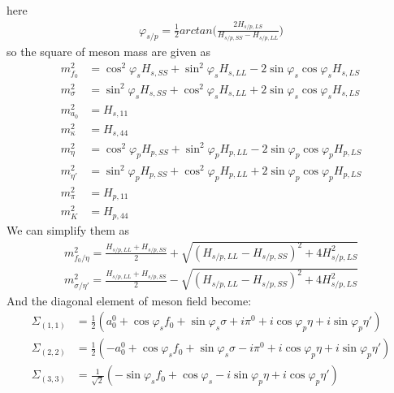 \documentclass[%
reprint,
superscriptaddress,
showpacs,preprintnumbers,
amsmath,amssymb,
aps,
prd,
]{revtex4-1}
\begin{document}
here
\begin{align}
\varphi_{s/p}=\frac{1}{2} arctan\Bigg(\frac{2H_{s/p,LS}}{H_{s/p,SS}-H_{s/p,LL}}\Bigg)
\end{align}
so the square of meson mass are given as
\begin{align}
m_{f_0}^2&=\cos^2\varphi_s H_{s,SS}+\sin^2 \varphi_s H_{s,LL}-2 \sin \varphi_s \cos \varphi_s H_{s,LS}\\
m_{\sigma}^2&=\sin^2\varphi_s H_{s,SS}+\cos^2 \varphi_s H_{s,LL}+2 \sin \varphi_s \cos \varphi_s H_{s,LS}\\
m_{a_0}^2&=H_{s,11}\\
m_{\kappa}^2&=H_{s,44}\\
m_{\eta}^2&=\cos^2\varphi_p H_{p,SS}+\sin^2 \varphi_p H_{p,LL}-2 \sin \varphi_p \cos \varphi_p H_{p,LS}\\
m_{\eta'}^2&=\sin^2\varphi_p H_{p,SS}+\cos^2 \varphi_p H_{p,LL}+2 \sin \varphi_p \cos \varphi_p H_{p,LS}\\
m_{\pi}^2&=H_{p,11}\\
m_{K}^2&=H_{p,44}
\end{align}
We can simplify them as
 \begin{align}
m_{f_0/\eta}^2=\frac{H_{s/p,LL}+H_{s/p,SS}}{2}+\sqrt{(H_{s/p,LL}-H_{s/p,SS})^2+4 H_{s/p,LS}^2}\\
m_{\sigma/\eta'}^2=\frac{H_{s/p,LL}+H_{s/p,SS}}{2}-\sqrt{(H_{s/p,LL}-H_{s/p,SS})^2+4 H_{s/p,LS}^2}
\end{align}
And the diagonal element of meson field become:
\begin{align}
\Sigma_{(1,1)}&=\frac{1}{2}(a_0^0+\cos\varphi_s f_0+\sin\varphi_s \sigma+i\pi^0 + i \cos\varphi_p \eta+i\sin\varphi_p \eta')\\
\Sigma_{(2,2)}&=\frac{1}{2}(- a_0^0+\cos\varphi_s f_0+\sin\varphi_s \sigma - i\pi^0  + i\cos\varphi_p \eta+i\sin\varphi_p \eta')\\
\Sigma_{(3,3)}&= \frac{1}{\sqrt{2} }(-\sin\varphi_s f_0 +\cos\varphi_s -i \sin\varphi_p\eta +i \cos\varphi_p \eta')
\end{align}


	
	
	
\end{document}
